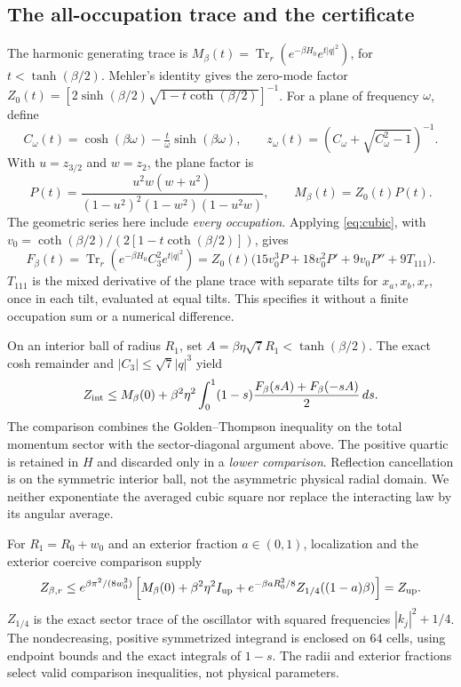 \documentclass[11pt]{article}
\newcommand{\Tr}{\operatorname{Tr}}
\begin{document}
\subsection{The all-occupation trace and the certificate}
The harmonic generating trace is
$M_\beta(t)=\Tr_r(e^{-\beta H_0}e^{t|q|^2})$, for
$t<\tanh(\beta/2)$. Mehler's identity \cite{Mehler} gives the zero-mode
factor
$Z_0(t)=[2\sinh(\beta/2)\sqrt{1-t\coth(\beta/2)}]^{-1}$.
For a plane of frequency $\omega$, define
\[
 C_\omega(t)=\cosh(\beta\omega)-\tfrac{t}{\omega}\sinh(\beta\omega),
 \qquad z_\omega(t)=(C_\omega+\sqrt{C_\omega^2-1})^{-1}.
\]
With $u=z_{3/2}$ and $w=z_2$, the plane factor is
\[
 P(t)=\frac{u^2w(w+u^2)}
 {(1-u^2)^2(1-w^2)(1-u^2w)},\qquad M_\beta(t)=Z_0(t)P(t).
\]
The geometric series here include \emph{every occupation}. Applying
\eqref{eq:cubic}, with
$v_0=\coth(\beta/2)/(2[1-t\coth(\beta/2)])$, gives
\begin{equation}
 F_\beta(t)=\Tr_r(e^{-\beta H_0}C_3^2e^{t|q|^2})
 =Z_0(t)\bigl(15v_0^3P+18v_0^2P'+9v_0P''+9T_{111}\bigr).
 \label{eq:moment}
\end{equation}
$T_{111}$ is the mixed derivative of the plane trace with separate tilts
for $x_a,x_b,x_r$, once in each tilt, evaluated at equal tilts. This
specifies it without a finite occupation sum or a numerical difference.

On an interior ball of radius $R_1$, set
$A=\beta\eta\sqrt7R_1<\tanh(\beta/2)$. The exact cosh remainder and
$|C_3|\le\sqrt7|q|^3$ yield
\[
 Z_{\rm int}\le M_\beta(0)+\beta^2\eta^2
 \int_0^1(1-s)\frac{F_\beta(sA)+F_\beta(-sA)}2\,ds.
\]
The comparison combines the Golden--Thompson inequality
\cite{GoldenThompson} on the total momentum sector with the
sector-diagonal argument above. The positive quartic is retained in
$H$ and discarded only in a \emph{lower comparison}. Reflection
cancellation is on the symmetric interior ball, not the asymmetric
physical radial domain. We neither exponentiate the averaged cubic
square nor replace the interacting law by its angular average.

For $R_1=R_0+w_0$ and an exterior fraction $a\in(0,1)$, localization
and the exterior coercive comparison supply
\begin{equation}
 Z_{\beta,r}\le e^{\beta\pi^2/(8w_0^2)}
 \left[M_\beta(0)+\beta^2\eta^2 I_{\rm up}
       +e^{-\beta aR_0^2/8}Z_{1/4}((1-a)\beta)\right]=Z_{\rm up}.
 \label{eq:partition}
\end{equation}
$Z_{1/4}$ is the exact sector trace of the oscillator with squared
frequencies $|k_j|^2+1/4$. The nondecreasing, positive symmetrized
integrand is enclosed on 64 cells, using endpoint bounds and the exact
integrals of $1-s$. The radii and exterior fractions select valid
comparison inequalities, not physical parameters.
\end{document}
